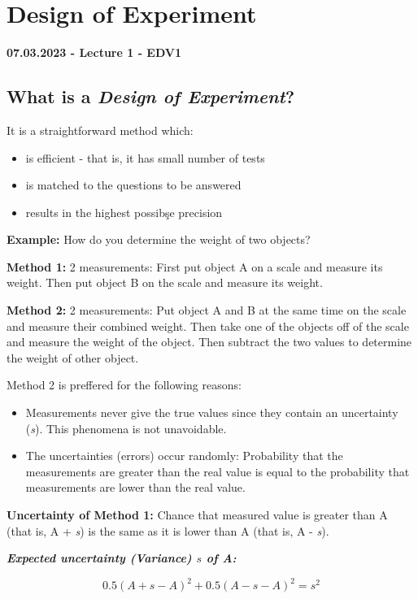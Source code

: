 \section{Design of Experiment}

\textbf{07.03.2023 - Lecture 1 - EDV1}

\subsection*{What is a \textit{Design of Experiment}?}

It is a straightforward method which:
\begin{itemize}
	\item is efficient - that is, it has small number of tests
	\item is matched to the questions to be answered
	\item results in the highest possibşe precision
\end{itemize}

\textbf{Example:} How do you determine the weight of two objects?

\textbf{Method 1:} 2 measurements: First put object A on a scale and measure its weight. Then put object B on the scale and measure its weight.

\textbf{Method 2:} 2 measurements: Put object A and B at the same time on the scale and measure their combined weight. Then take one of the objects off of the scale and measure the weight of the object. Then subtract the two values to determine the weight of other object.

Method 2 is preffered for the following reasons:
\begin{itemize}
	\item Measurements never give the true values since they contain an uncertainty (\textit{s}). This phenomena is not unavoidable.
	\item The uncertainties (errors) occur randomly: Probability that the measurements are greater than the real value is equal to the probability that measurements are lower than the real value.
\end{itemize}

\textbf{Uncertainty of Method 1:} Chance that measured value is greater than A (that is, A + \textit{s}) is the same as it is lower than A (that is, A - \textit{s}).


\textit{\textbf{Expected uncertainty (Variance) $s$ of A:}}

$$0.5(A + s - A)^2 + 0.5 (A-s-A)^2 = s^2$$

